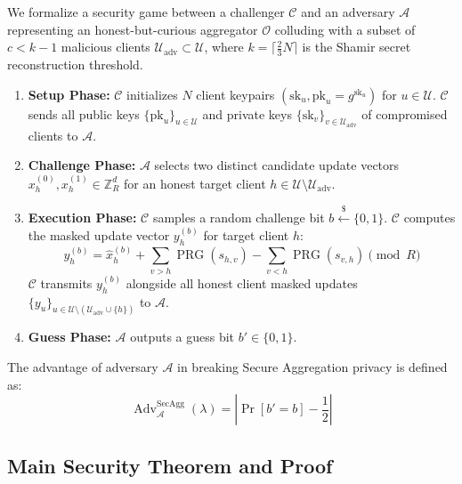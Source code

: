 We formalize a security game between a challenger $\mathcal{C}$ and an adversary $\mathcal{A}$ representing an honest-but-curious aggregator $\mathcal{O}$ colluding with a subset of $c < k - 1$ malicious clients $\mathcal{U}_{\text{adv}} \subset \mathcal{U}$, where $k = \lceil \frac{2}{3} N \rceil$ is the Shamir secret reconstruction threshold.

\begin{enumerate}
    \item \textbf{Setup Phase:} $\mathcal{C}$ initializes $N$ client keypairs $(\text{sk}_u, \text{pk}_u = g^{\text{sk}_u})$ for $u \in \mathcal{U}$. $\mathcal{C}$ sends all public keys $\{\text{pk}_u\}_{u \in \mathcal{U}}$ and private keys $\{\text{sk}_v\}_{v \in \mathcal{U}_{\text{adv}}}$ of compromised clients to $\mathcal{A}$.
    \item \textbf{Challenge Phase:} $\mathcal{A}$ selects two distinct candidate update vectors $x_h^{(0)}, x_h^{(1)} \in \mathbb{Z}_R^d$ for an honest target client $h \in \mathcal{U} \setminus \mathcal{U}_{\text{adv}}$.
    \item \textbf{Execution Phase:} $\mathcal{C}$ samples a random challenge bit $b \stackrel{\$}{\leftarrow} \{0, 1\}$. $\mathcal{C}$ computes the masked update vector $y_h^{(b)}$ for target client $h$:
    \begin{equation}
        y_h^{(b)} = \hat{x}_h^{(b)} + \sum_{v > h} \operatorname{PRG}(s_{h,v}) - \sum_{v < h} \operatorname{PRG}(s_{v,h}) \pmod R
    \end{equation}
    $\mathcal{C}$ transmits $y_h^{(b)}$ alongside all honest client masked updates $\{y_u\}_{u \in \mathcal{U} \setminus (\mathcal{U}_{\text{adv}} \cup \{h\})}$ to $\mathcal{A}$.
    \item \textbf{Guess Phase:} $\mathcal{A}$ outputs a guess bit $b' \in \{0, 1\}$.
\end{enumerate}

The advantage of adversary $\mathcal{A}$ in breaking Secure Aggregation privacy is defined as:
\begin{equation}
    \operatorname{Adv}_{\mathcal{A}}^{\text{SecAgg}}(\lambda) = \left| \operatorname{Pr}[b' = b] - \frac{1}{2} \right|
\end{equation}

\subsection{Main Security Theorem and Proof}

